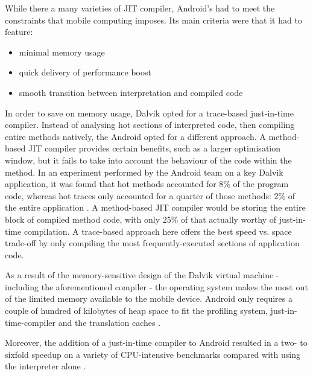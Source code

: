 While there a many varieties of JIT compiler, Android's had to meet the constraints that mobile computing imposes. Its main criteria were that it had to feature:

\begin{itemize}
    \item minimal memory usage
    \item quick delivery of performance boost
    \item smooth transition between interpretation and compiled code
\end{itemize}

In order to save on memory usage, Dalvik opted for a trace-based just-in-time compiler. Instead of analysing hot sections of interpreted code, then compiling entire methods natively, the Android opted for a different approach. A method-based JIT compiler provides certain benefits, such as a larger optimisation window, but it fails to take into account the behaviour of the code within the method. In an experiment performed by the Android team on a key Dalvik application, it was found that hot methods accounted for 8\% of the program code, whereas hot traces only accounted for a quarter of those methods: 2\% of the entire application \cite{android_22}. A method-based JIT compiler would be storing the entire block of compiled method code, with only 25\% of that actually worthy of just-in-time compilation. A trace-based approach here offers the best speed vs. space trade-off by only compiling the most frequently-executed sections of application code.

As a result of the memory-sensitive design of the Dalvik virtual machine - including the aforementioned compiler - the operating system makes the most out of the limited memory available to the mobile device. Android only requires a couple of hundred of kilobytes of heap space to fit the profiling system, just-in-time-compiler and the translation caches \cite{android_22}.

Moreover, the addition of a just-in-time compiler to Android resulted in a two- to sixfold speedup on a variety of CPU-intensive benchmarks compared with using the interpreter alone \cite{android_22}.
